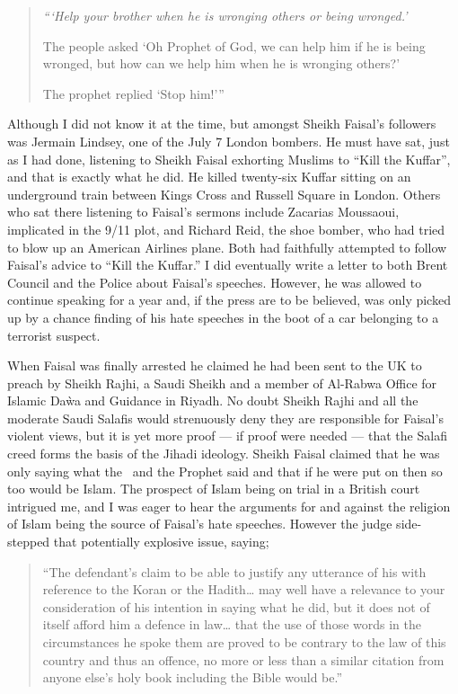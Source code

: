 \documentclass[12pt]{memoir}
\begin{document}
\begin{quote}
\itshape
“‘Help your brother when he is wronging others or being wronged.’

The people asked ‘Oh Prophet of God, we can help him if he is being wronged,
but how can we help him when he is wronging others?’

The prophet replied ‘Stop him!’”
\end{quote}

Although I did not know it at the time,
but amongst Sheikh Faisal’s followers was Jermain Lindsey,
one of the July 7 London bombers.
He must have sat, just as I had done, listening to Sheikh Faisal
exhorting Muslims to “Kill the Kuffar”, and that is exactly what he did.
He killed twenty-six Kuffar sitting on an underground train
between Kings Cross and Russell Square in London.
Others who sat there listening to Faisal’s sermons include Zacarias Moussaoui,
implicated in the 9/11 plot, and Richard Reid, the shoe bomber,
who had tried to blow up an American Airlines plane.
Both had faithfully attempted to follow Faisal’s advice to “Kill the Kuffar.”
I did eventually write a letter to both Brent Council
and the Police about Faisal’s speeches.
However, he was allowed to continue speaking for a year and,
if the press are to be believed,
was only picked up by a chance finding of 
his hate speeches in the boot of a car belonging to a terrorist suspect.

When Faisal was finally arrested he claimed he had been sent to the UK
to preach by Sheikh Rajhi, a Saudi Sheikh and a member of Al-Rabwa Office
for Islamic Da\`wa and Guidance in Riyadh.
No doubt Sheikh Rajhi and all the moderate Saudi Salafis
would strenuously deny they are responsible for Faisal’s violent views,
but it is yet more proof — if proof were needed —
that the Salafi creed forms the basis of the Jihadi ideology.
Sheikh Faisal claimed that he was only saying what the \Quran\
and the Prophet said and that if he were put on 
then so too would be Islam.
The prospect of Islam being on trial in a British court intrigued me,
and I was eager to hear the arguments for and against the religion of Islam
being the source of Faisal’s hate speeches.
However the judge side-stepped that potentially explosive issue, saying;

\begin{quote}
“The defendant’s claim  to be able to justify any utterance
of his with reference to the Koran or the Hadith…
may well have a relevance to your consideration of his intention
in saying what he did, but it does not of itself afford him a defence in law…
that the use of those words in the circumstances he spoke them
are proved to be contrary to the law of this country and thus an offence,
no more or less than a similar citation from anyone else’s holy book
including the Bible would be.”
\end{quote}
\end{document}
